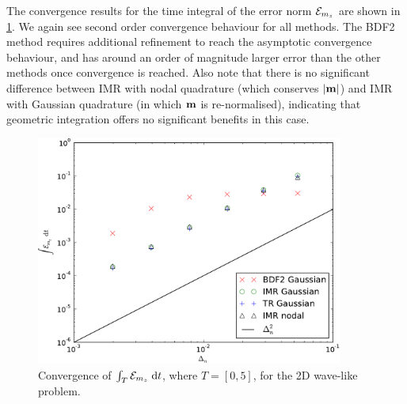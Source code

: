 The convergence results for the time integral of the error norm $\mathcal{E}_{m_z}$ are shown in \cref{fig:convergence-long-time-mz-norm}.
We again see second order convergence behaviour for all methods.
The BDF2 method requires additional refinement to reach the asymptotic convergence behaviour, and has around an order of magnitude larger error than the other methods once convergence is reached.
Also note that there is no significant difference between IMR with nodal quadrature (which conserves $\left|{\boldsymbol{\mathrm{m}}} \right|$) and IMR with Gaussian quadrature (in which $\boldsymbol{\mathrm{m}}$ is re-normalised), indicating that geometric integration offers no significant benefits in this case.
\begin{figure}
  \centering
  \includegraphics[width=0.9\textwidth]{plots/2d_wave_solution_convergence_long_time/auxerr1integralvsfakemeanofdts.pdf}
  \caption{Convergence of ${\int_T {\mathcal{E}_{m_z}} {\; \mathrm{{d}}} t}$, where $T=[0,5]$, for the 2D wave-like problem.
  }
  \label{fig:convergence-long-time-mz-norm}
\end{figure}




